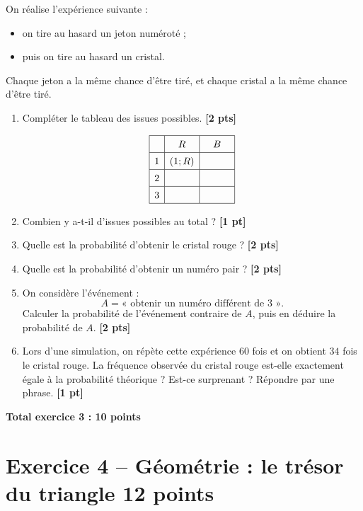 \documentclass[11pt,a4paper]{article}
\newcommand{\pts}[1]{\hfill \textbf{[#1 pt]}}
\newcommand{\ptss}[1]{\hfill \textbf{[#1 pts]}}
\begin{document}
On réalise l'expérience suivante :
\begin{itemize}
    \item on tire au hasard un jeton numéroté ;
    \item puis on tire au hasard un cristal.
\end{itemize}

Chaque jeton a la même chance d'être tiré, et chaque cristal a la même chance d'être tiré.

\begin{enumerate}[label=\textbf{\arabic*)}]

\item Compléter le tableau des issues possibles. \ptss{2}

\[
\renewcommand{\arraystretch}{1.4}
\begin{array}{|c|c|c|}
\hline
 & R & B \\
\hline
1 & (1;R) & \phantom{(1;B)} \\
\hline
2 & \phantom{(2;R)} & \phantom{(2;B)} \\
\hline
3 & \phantom{(3;R)} & \phantom{(3;B)} \\
\hline
\end{array}
\]

\item Combien y a-t-il d'issues possibles au total ? \pts{1}

\item Quelle est la probabilité d'obtenir le cristal rouge ? \ptss{2}

\item Quelle est la probabilité d'obtenir un numéro pair ? \ptss{2}

\item On considère l'événement :
\[
A=\text{« obtenir un numéro différent de }3\text{ »}.
\]
Calculer la probabilité de l'événement contraire de $A$, puis en déduire la probabilité de $A$. \ptss{2}

\item Lors d'une simulation, on répète cette expérience $60$ fois et on obtient $34$ fois le cristal rouge.
La fréquence observée du cristal rouge est-elle exactement égale à la probabilité théorique ? Est-ce surprenant ? Répondre par une phrase. \pts{1}

\end{enumerate}

\hfill \textbf{Total exercice 3 : 10 points}

\section*{Exercice 4 -- Géométrie : le trésor du triangle \hfill 12 points}
\end{document}
